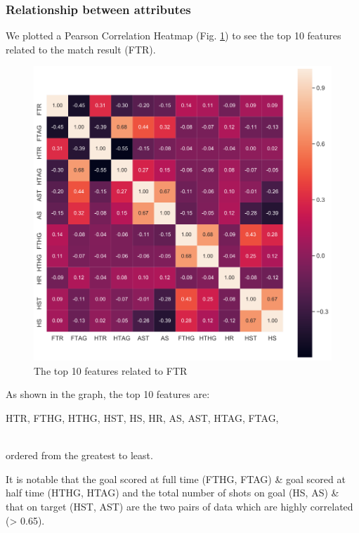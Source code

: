 \documentclass{article}
\begin{document}
\subsubsection{Relationship between attributes}
We plotted a Pearson Correlation Heatmap (Fig. \ref{fig:top-10-features-in-raw-data}) to see the top 10 features related to the match result (FTR).

\begin{figure}[ht]
\centering
\includegraphics[scale=0.3]{graphs/top-10-features-in-raw-data.png}
\caption{The top 10 features related to FTR}
\label{fig:top-10-features-in-raw-data}
\end{figure}

As shown in the graph, the top 10 features are: \\
\centerline{HTR,  FTHG, HTHG, HST, HS, HR, AS, AST, HTAG, FTAG,}	\\
ordered from the greatest to least.

It is notable that the goal scored at full time (FTHG, FTAG)  \& goal scored at half time (HTHG, HTAG) and
the total number of shots on goal (HS, AS)  \& that on target (HST, AST) are the two pairs of data which are highly correlated (> 0.65).

\end{document}
